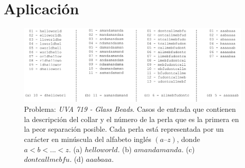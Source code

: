\section{Aplicación}\label{Application}

\begin{figure}[H]
	\centering
	\includegraphics[width=0.8\linewidth]{doc/Application/img/cases-necklace}
	\caption{Problema: \textit{UVA 719 - Glass Beads}. Casos de entrada que contienen la descripción del collar y el número de la perla que es la primera en la peor separación posible. Cada perla está representada por un carácter en minúscula del alfabeto inglés $(a–z)$, donde $a < b < ... < z$. (a) $helloworld$. (b) $amandamanda$. (c) $dontcallmebfu$. (d) $aaabaaa$. }
	\label{fig:UVA-719-Input-Output}
\end{figure}


\renewcommand{\lstlistingname}{Implementación}%
\renewcommand{\lstlistlistingname}{Lista de \lstlistingname s}%
